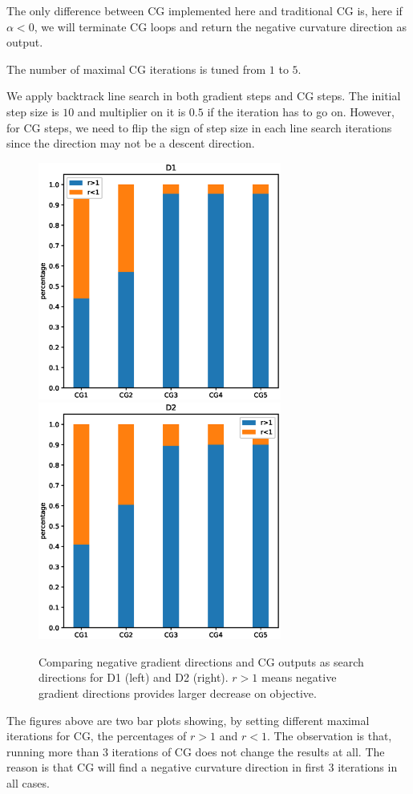 \documentclass[12pt]{article}
\begin{document}
The only difference between CG implemented here and traditional CG is, here if $\alpha<0$, we will terminate CG loops and return the negative curvature direction as output. 

The number of maximal CG iterations is tuned from $1$ to $5$.

We apply backtrack line search in both gradient steps and CG steps. The initial step size is $10$ and multiplier on it is $0.5$ if the iteration has to go on. However, for CG steps, we need to flip the sign of step size in each line search iterations since the direction may not be a descent direction. 
 
\begin{figure}[h]
\includegraphics[width=8cm]{CGD1.eps}
\includegraphics[width=8cm]{CGD2.eps}
\caption{Comparing negative gradient directions and CG outputs as search directions for D1 (left) and D2 (right). $r>1$ means negative gradient directions provides larger decrease on objective.}
\label{fig:CGvsGD}
\end{figure}

The figures above are two bar plots showing, by setting different maximal iterations for CG, the percentages of $r>1$ and $r<1$. The observation is that, running more than $3$ iterations of CG does not change the results at all. The reason is that CG will find a negative curvature direction in first $3$ iterations in all cases. 
\end{document}
